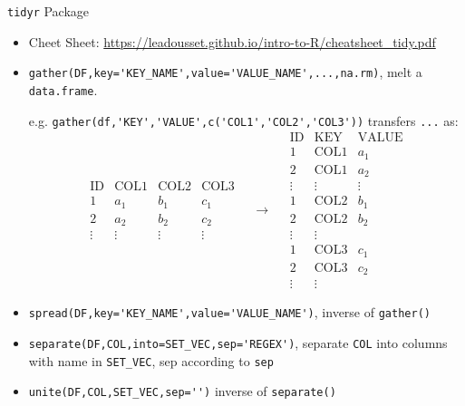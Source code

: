 \begin{point}
    \lstinline|tidyr| Package
\end{point}
\begin{itemize}[topsep=2pt,itemsep=0pt]
    \item Cheet Sheet: \url{https://leadousset.github.io/intro-to-R/cheatsheet_tidy.pdf}
    \item \lstinline|gather(DF,key='KEY_NAME',value='VALUE_NAME',...,na.rm)|, melt a \lstinline|data.frame|. 
    
    e.g. \lstinline|gather(df,'KEY','VALUE',c('COL1','COL2','COL3'))| transfers \lstinline|...| as:
    \[
        \begin{matrix}
            \text{ID}&\text{COL1}&\text{COL2}&\text{COL3}\\
            1&a_1&b_1&c_1\\
            2&a_2&b_2&c_2\\
            \vdots&\vdots&\vdots&\vdots
        \end{matrix}
        \quad\to\quad
        \begin{matrix}
            \text{ID}&\text{KEY}&\text{VALUE}\\
            1&\text{COL1}&a_1\\
            2&\text{COL1}&a_2\\
            \vdots&\vdots&\vdots\\
            1&\text{COL2}&b_1\\
            2&\text{COL2}&b_2\\
            \vdots&\vdots\\
            1&\text{COL3}&c_1\\
            2&\text{COL3}&c_2\\
            \vdots&\vdots
        \end{matrix}
    \]
    \item \lstinline|spread(DF,key='KEY_NAME',value='VALUE_NAME')|, inverse of \lstinline|gather()|
    \item \lstinline|separate(DF,COL,into=SET_VEC,sep='REGEX')|, separate \lstinline|COL| into columns with name in \lstinline|SET_VEC|, sep according to \lstinline|sep|
    \item \lstinline|unite(DF,COL,SET_VEC,sep='')| inverse of \lstinline|separate()|
\end{itemize}

    



